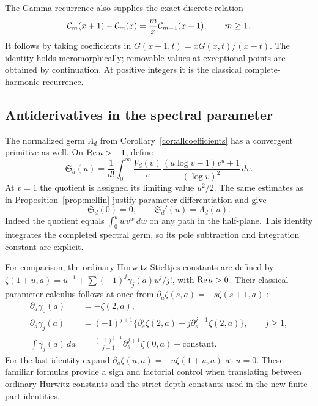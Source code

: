 The Gamma recurrence also supplies the exact discrete relation
\begin{equation}\label{eq:Cshift}
 \mathcal C_m(x+1)-\mathcal C_m(x)=\frac m x\mathcal C_{m-1}(x+1),\qquad m\ge1.
\end{equation}
It follows by taking coefficients in
$G(x+1,t)=xG(x,t)/(x-t)$. The identity holds meromorphically;
removable values at exceptional points are obtained by continuation.
At positive integers it is the classical complete-harmonic recurrence.

\subsection{Antiderivatives in the spectral parameter}

The normalized germ $\Lambda_d$ from Corollary~\ref{cor:allcoefficients}
has a convergent primitive as well. On $\operatorname{Re} u>-1$, define
\begin{equation}\label{eq:spectral_primitive}
 \mathfrak S_d(u)=\frac1{d!}\int_0^\infty\frac{V_d(v)}v
   \frac{(u\log v-1)v^u+1}{(\log v)^2}\,dv.
\end{equation}
At $v=1$ the quotient is assigned its limiting value $u^2/2$.
The same estimates as in Proposition~\ref{prop:mellin} justify
parameter differentiation and give
\begin{equation}\label{eq:spectral_primitive_derivative}
 \mathfrak S_d(0)=0,\qquad \mathfrak S_d'(u)=\Lambda_d(u).
\end{equation}
Indeed the quotient equals $\int_0^u wv^w\,dw$ on any path in the
half-plane. This identity integrates the completed spectral germ,
so its pole subtraction and integration constant are explicit.

For comparison, the ordinary Hurwitz Stieltjes constants are defined
by $\zeta(1+u,a)=u^{-1}+\sum(-1)^j\gamma_j(a)u^j/j!$,
with $\operatorname{Re} a>0$. Their classical parameter calculus follows at once
from $\partial_a\zeta(s,a)=-s\zeta(s+1,a)$ \cite{DLMF}:
\begin{align}
 \partial_a\gamma_0(a)&=-\zeta(2,a),\\
 \partial_a\gamma_j(a)&=(-1)^{j+1}
     \{\partial_s^j\zeta(2,a)+j\partial_s^{j-1}\zeta(2,a)\},
       \qquad j\ge1,\label{eq:hurwitz_derivative}\\
 \int\gamma_j(a)\,da
     &=\frac{(-1)^{j+1}}{j+1}
                       \partial_s^{j+1}\zeta(0,a)+\text{constant}.
 \label{eq:hurwitz_primitive}
\end{align}
For the last identity expand
$\partial_a\zeta(u,a)=-u\zeta(1+u,a)$ at $u=0$.
These familiar formulas provide a sign and factorial control when
translating between ordinary Hurwitz constants and the strict-depth
constants used in the new finite-part identities.
